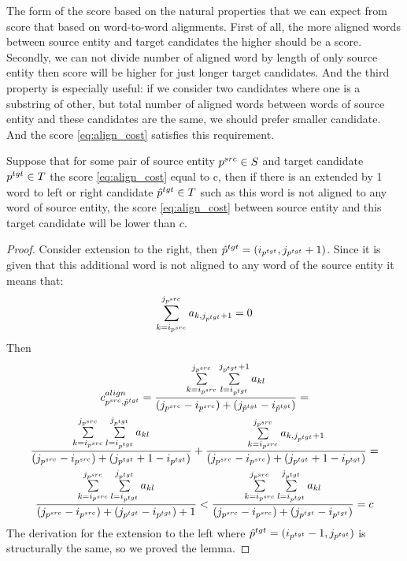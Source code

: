 The form of the score based on the natural properties that we can expect from score that based on word-to-word alignments.
First of all, the more aligned words between source entity and target candidates the higher should be a score.
Secondly, we can not divide number of aligned word by length of only source entity then
score will be higher for just longer target candidates.
And the third property is especially useful: if we consider two candidates where one is a
substring of other, but total number of aligned words between words of
source entity and these candidates are the same, we should prefer smaller candidate.
And the score \eqref{eq:align_cost} satisfies this requirement.
\begin{lemma} \label{lemma:align_cost_decrease}
    Suppose that for some pair of source entity \( p^{src} \in S \) and target candidate \( p^{tgt} \in T \)
    the score \eqref{eq:align_cost} equal to c, then if there is an extended by 1 word to left or
    right candidate \( \hat{p}^{tgt} \in T \) such as this word is not aligned to any word of source
    entity, the score \eqref{eq:align_cost} between source entity and this target candidate
    will be lower than \( c \).
\end{lemma}
\begin{proof}
    Consider extension to the right, then \( \hat{p}^{tgt} = (i_{p^{tgt}}, j_{p^{tgt}} + 1) \). Since it is
    given that this additional word is not aligned to any word of the source entity it means that:
    \[
        \sum\limits_{k=i_{p^{src}}}^{j_{p^{src}}} a_{k,j_{p^{tgt}} + 1} = 0
    \]
    Then
    \begin{multline*}
        c_{p^{src}, \hat{p}^{tgt}}^{align} =
        \frac{\sum\limits_{k=i_{p^{src}}}^{j_{p^{src}}} \sum\limits_{l=i_{p^{tgt}}}^{j_{p^{tgt}} + 1} a_{kl}}
        {(j_{p^{src}} - i_{p^{src}}) + (j_{\hat{p}^{tgt}} - i_{\hat{p}^{tgt}})} =                                \\
        \frac{\sum\limits_{k=i_{p^{src}}}^{j_{p^{src}}} \sum\limits_{l=i_{p^{tgt}}}^{j_{p^{tgt}}} a_{kl}}
        {(j_{p^{src}} - i_{p^{src}}) + (j_{p^{tgt}} + 1 - i_{p^{tgt}})} +
        \frac{\sum\limits_{k=i_{p^{src}}}^{j_{p^{src}}} a_{k,j_{p^{tgt}} + 1}}
        {(j_{p^{src}} - i_{p^{src}}) + (j_{p^{tgt}} + 1 - i_{p^{tgt}})} =                                        \\
        \frac{\sum\limits_{k=i_{p^{src}}}^{j_{p^{src}}} \sum\limits_{l=i_{p^{tgt}}}^{j_{p^{tgt}}} a_{kl}}
        {(j_{p^{src}} - i_{p^{src}}) + (j_{p^{tgt}} - i_{p^{tgt}}) + 1} <
        \frac{\sum\limits_{k=i_{p^{src}}}^{j_{p^{src}}} \sum\limits_{l=i_{p^{tgt}}}^{j_{p^{tgt}}} a_{kl}}
        {(j_{p^{src}} - i_{p^{src}}) + (j_{p^{tgt}} - i_{p^{tgt}})} = c
    \end{multline*}
    The derivation for the extension to the left where \( \hat{p}^{tgt} = (i_{p^{tgt}} - 1, j_{p^{tgt}}) \) is structurally the same, so we
    proved the lemma.
\end{proof}

